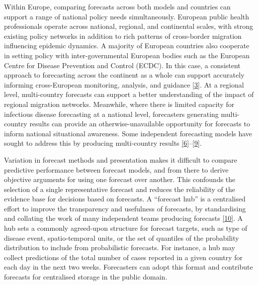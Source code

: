 \documentclass[
]{article}
\begin{document}
Within Europe, comparing forecasts across both models and countries can support a range of national policy needs simultaneously. European public health professionals operate across national, regional, and continental scales, with strong existing policy networks in addition to rich patterns of cross-border migration influencing epidemic dynamics. A majority of European countries also cooperate in setting policy with inter-governmental European bodies such as the European Centre for Disease Prevention and Control (ECDC). In this case, a consistent approach to forecasting across the continent as a whole can support accurately informing cross-European monitoring, analysis, and guidance \protect\hyperlink{ref-europeancentrefordiseasepreventionandcontrolForecastingCOVID19Cases2021}{{[}3{]}}. At a regional level, multi-country forecasts can support a better understanding of the impact of regional migration networks. Meanwhile, where there is limited capacity for infectious disease forecasting at a national level, forecasters generating multi-country results can provide an otherwise-unavailable opportunity for forecasts to inform national situational awareness. Some independent forecasting models have sought to address this by producing multi-country results \protect\hyperlink{ref-aguasModellingCOVID19Pandemic2020}{{[}6{]}}--\protect\hyperlink{ref-agostoMonitoringCOVID19Contagion2021}{{[}9{]}}.

Variation in forecast methods and presentation makes it difficult to compare predictive performance between forecast models, and from there to derive objective arguments for using one forecast over another. This confounds the selection of a single representative forecast and reduces the reliability of the evidence base for decisions based on forecasts. A ``forecast hub'' is a centralised effort to improve the transparency and usefulness of forecasts, by standardising and collating the work of many independent teams producing forecasts \protect\hyperlink{ref-reichCollaborativeMultiyearMultimodel2019}{{[}10{]}}. A hub sets a commonly agreed-upon structure for forecast targets, such as type of disease event, spatio-temporal units, or the set of quantiles of the probability distribution to include from probabilistic forecasts. For instance, a hub may collect predictions of the total number of cases reported in a given country for each day in the next two weeks. Forecasters can adopt this format and contribute forecasts for centralised storage in the public domain.
\end{document}
